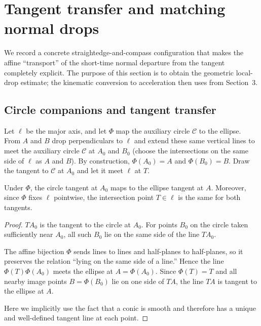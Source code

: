 \section{Tangent transfer and matching normal drops}

We record a concrete straightedge-and-compass configuration that makes the affine ``transport'' of the short-time normal departure from the tangent completely explicit.
The purpose of this section is to obtain the geometric local-drop estimate; the kinematic conversion to acceleration then uses  from Section~3.

\subsection{Circle companions and tangent transfer}

Let $\ell$ be the major axis, and let $\Phi$ map the auxiliary circle $\mathcal{C}$ to the ellipse. From $A$ and $B$ drop perpendiculars to $\ell$ and extend these same vertical lines to meet the auxiliary circle $\mathcal C$ at $A_0$ and $B_0$ (choose the intersections on the same side of $\ell$ as $A$ and $B$). By construction, $\Phi(A_0)=A$ and $\Phi(B_0)=B$.
Draw the tangent to $\mathcal C$ at $A_0$ and let it meet $\ell$ at $T$.

\begin{lemma}
  \label{lem:tangent-transfer}
  Under $\Phi$, the circle tangent at $A_0$ maps to the ellipse tangent at $A$. Moreover, since $\Phi$ fixes $\ell$ pointwise, the intersection point $T\in\ell$ is the same for both tangents.
\end{lemma}
\begin{proof}
  $TA_0$ is the tangent to the circle at $A_0$. For points $B_0$ on the circle taken sufficiently near $A_0$, all such $B_0$ lie on the same side of the line $TA_0$.

  The affine bijection $\Phi$ sends lines to lines and half-planes to half-planes, so it preserves the relation ``lying on the same side of a line.'' Hence the line $\Phi(T)\Phi(A_0)$ meets the ellipse at $A=\Phi(A_0)$. Since $\Phi(T)=T$ and all nearby image points $B=\Phi(B_0)$ lie on one side of $TA$, the line $TA$ is tangent to the ellipse at $A$.

  Here we implicitly use the fact that a conic is smooth and therefore has a unique and well-defined tangent line at each point.\qedhere
\end{proof}


